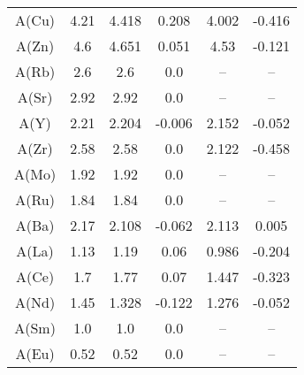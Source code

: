 \begin{table}[ht]
\begin{tabular}{cccccc}
A(Cu) & 4.21 & 4.418 & 0.208 & 4.002 & -0.416 \\
A(Zn) & 4.6 & 4.651 & 0.051 & 4.53 & -0.121 \\
A(Rb) & 2.6 & 2.6 & 0.0 & -- & -- \\
A(Sr) & 2.92 & 2.92 & 0.0 & -- & -- \\
A(Y) & 2.21 & 2.204 & -0.006 & 2.152 & -0.052 \\
A(Zr) & 2.58 & 2.58 & 0.0 & 2.122 & -0.458 \\
A(Mo) & 1.92 & 1.92 & 0.0 & -- & -- \\
A(Ru) & 1.84 & 1.84 & 0.0 & -- & -- \\
A(Ba) & 2.17 & 2.108 & -0.062 & 2.113 & 0.005 \\
A(La) & 1.13 & 1.19 & 0.06 & 0.986 & -0.204 \\
A(Ce) & 1.7 & 1.77 & 0.07 & 1.447 & -0.323 \\
A(Nd) & 1.45 & 1.328 & -0.122 & 1.276 & -0.052 \\
A(Sm) & 1.0 & 1.0 & 0.0 & -- & -- \\
A(Eu) & 0.52 & 0.52 & 0.0 & -- & -- \\
\hline
\end{tabular}
\end{table}